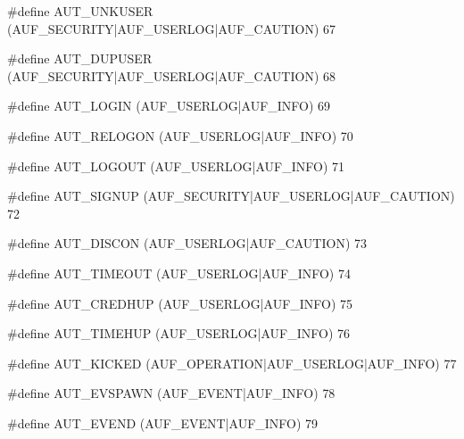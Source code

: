 \documentclass{article}
\begin{document}
\begin{cxxmacro}
{\#define}
        {AUT\_UNKUSER}
        {(AUF\_SECURITY|AUF\_USERLOG|AUF\_CAUTION)}
        {}
        {67}
\end{cxxmacro}
\begin{cxxmacro}
{\#define}
        {AUT\_DUPUSER}
        {(AUF\_SECURITY|AUF\_USERLOG|AUF\_CAUTION)}
        {}
        {68}
\end{cxxmacro}
\begin{cxxmacro}
{\#define}
        {AUT\_LOGIN}
        {(AUF\_USERLOG|AUF\_INFO)}
        {}
        {69}
\end{cxxmacro}
\begin{cxxmacro}
{\#define}
        {AUT\_RELOGON}
        {(AUF\_USERLOG|AUF\_INFO)}
        {}
        {70}
\end{cxxmacro}
\begin{cxxmacro}
{\#define}
        {AUT\_LOGOUT}
        {(AUF\_USERLOG|AUF\_INFO)}
        {}
        {71}
\end{cxxmacro}
\begin{cxxmacro}
{\#define}
        {AUT\_SIGNUP}
        {(AUF\_SECURITY|AUF\_USERLOG|AUF\_CAUTION)}
        {}
        {72}
\end{cxxmacro}
\begin{cxxmacro}
{\#define}
        {AUT\_DISCON}
        {(AUF\_USERLOG|AUF\_CAUTION)}
        {}
        {73}
\end{cxxmacro}
\begin{cxxmacro}
{\#define}
        {AUT\_TIMEOUT}
        {(AUF\_USERLOG|AUF\_INFO)}
        {}
        {74}
\end{cxxmacro}
\begin{cxxmacro}
{\#define}
        {AUT\_CREDHUP}
        {(AUF\_USERLOG|AUF\_INFO)}
        {}
        {75}
\end{cxxmacro}
\begin{cxxmacro}
{\#define}
        {AUT\_TIMEHUP}
        {(AUF\_USERLOG|AUF\_INFO)}
        {}
        {76}
\end{cxxmacro}
\begin{cxxmacro}
{\#define}
        {AUT\_KICKED}
        {(AUF\_OPERATION|AUF\_USERLOG|AUF\_INFO)}
        {}
        {77}
\end{cxxmacro}
\begin{cxxmacro}
{\#define}
        {AUT\_EVSPAWN}
        {(AUF\_EVENT|AUF\_INFO)}
        {}
        {78}
\end{cxxmacro}
\begin{cxxmacro}
{\#define}
        {AUT\_EVEND}
        {(AUF\_EVENT|AUF\_INFO)}
        {}
        {79}
\end{cxxmacro}
\end{document}
